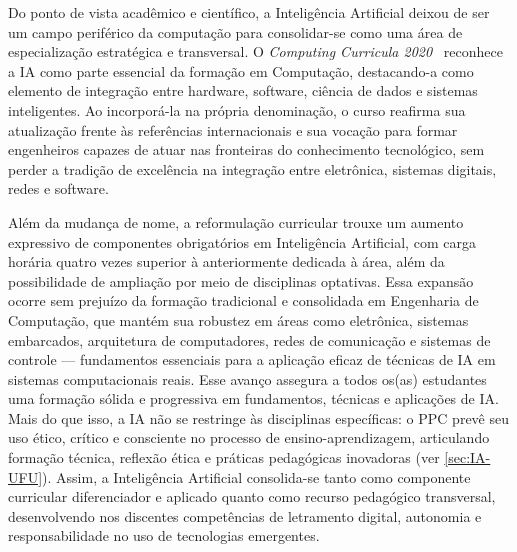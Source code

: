 Do ponto de vista acadêmico e científico, a Inteligência Artificial deixou de ser um campo periférico da computação para consolidar-se como uma área de especialização estratégica e transversal. O \textit{Computing Curricula 2020}~\cite{ACM:CC2020} reconhece a IA como parte essencial da formação em Computação, destacando-a como elemento de integração entre hardware, software, ciência de dados e sistemas inteligentes. Ao incorporá-la na própria denominação, o curso reafirma sua atualização frente às referências internacionais e sua vocação para formar engenheiros capazes de atuar nas fronteiras do conhecimento tecnológico, sem perder a tradição de excelência na integração entre eletrônica, sistemas digitais, redes e software.


Além da mudança de nome, a reformulação curricular trouxe um aumento expressivo de componentes obrigatórios em Inteligência Artificial, com carga horária quatro vezes superior à anteriormente dedicada à área, além da possibilidade de ampliação por meio de disciplinas optativas. Essa expansão ocorre sem prejuízo da formação tradicional e consolidada em Engenharia de Computação, que mantém sua robustez em áreas como eletrônica, sistemas embarcados, arquitetura de computadores, redes de comunicação e sistemas de controle — fundamentos essenciais para a aplicação eficaz de técnicas de IA em sistemas computacionais reais. \fraseaplicada Esse avanço assegura a todos os(as) estudantes uma formação sólida e progressiva em fundamentos, técnicas e aplicações de IA. Mais do que isso, a IA não se restringe às disciplinas específicas: o PPC prevê seu uso ético, crítico e consciente no processo de ensino-aprendizagem, articulando formação técnica, reflexão ética e práticas pedagógicas inovadoras (ver \autoref{sec:IA-UFU}). Assim, a Inteligência Artificial consolida-se tanto como componente curricular diferenciador e aplicado quanto como recurso pedagógico transversal, desenvolvendo nos discentes competências de letramento digital, autonomia e responsabilidade no uso de tecnologias emergentes.

